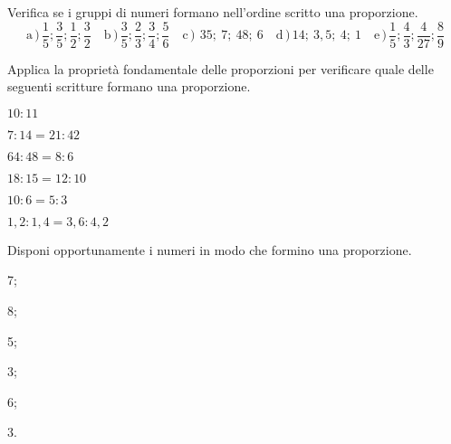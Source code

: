 
\begin{esercizio}
\label{ese:3.115}
Verifica se i gruppi di numeri formano nell'ordine scritto una proporzione.
\[
\text{a}\,)\,\frac{1}{5}; \frac{3}{5}; \frac{1}{2}; \frac{3}{2}\quad
\text{b}\,)\,\frac{3}{5}; \frac{2}{3}; \frac{3}{4}; \frac{5}{6}\quad
\text{c}\,)\,~35;~7;~48;~6\quad
\text{d}\,)\,14;~3,5;~4;~1\quad
\text{e}\,)\,\frac{1}{5}; \frac{4}{3}; \frac{4}{27}; \frac{8}{9}
\]
\end{esercizio}

\begin{esercizio}
\label{ese:3.116}
Applica la proprietà fondamentale delle proporzioni per verificare quale 
delle seguenti scritture formano una proporzione.

\begin{htmulticols}{2}
\TabPositions{3.7cm}
\begin{enumeratees}
\spazielenx
\item \(10:11 \) \tab\sino 
\item \(7:14 =21:42\) \tab\sino
\item \(64:48 =8:6\) \tab\sino
\item \(18:15 =12:10\) \tab\sino
\item \(10:6 =5:3\) \tab\sino
\item \(1,2:1,4 =3,6:4,2\) \tab\sino
\end{enumeratees}
\end{htmulticols}
\end{esercizio}

\begin{esercizio}
\label{ese:3.117}
Disponi opportunamente i numeri in modo che formino una proporzione.

\begin{htmulticols}{3}
\begin{enumeratees}
\item 7;
\item 8;
\item 5;
\item 3;
\item 6;
\item 3.
\end{enumeratees}
 \end{htmulticols}
\end{esercizio}

